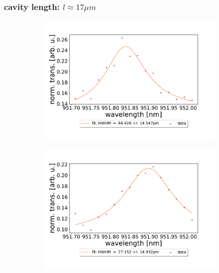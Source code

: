 \begin{figure}[h!]
\begin{subfigure}[b]{0.49\textwidth}
        \caption{}
        \label{fig:70um_M3:M5_fit_5}
    \end{subfigure}
\end{figure}

\clearpage
\subsubsection*{cavity length: $l \approx 17 \mu m$}

\begin{figure}[h!]
    \centering
    \begin{subfigure}[b]{0.49\textwidth}
        \includegraphics[width=\textwidth]{figures/results/double fano fits/30um_M3:M5_fit_1.pdf}
        \caption{}
        \label{fig:30um_M3:M5_fit_1}
    \end{subfigure}
    \begin{subfigure}[b]{0.49\textwidth}
        \includegraphics[width=\textwidth]{figures/results/double fano fits/30um_M3:M5_fit_2.pdf}

\end{subfigure}
\end{figure}
